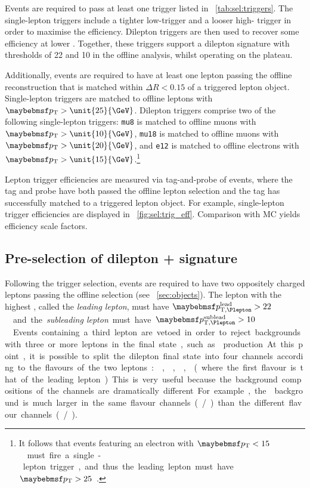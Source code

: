 Events are required to pass at least one trigger listed in \Table~\ref{tab:sel:triggers}. 
The single-lepton triggers include a tighter low-\pt trigger and a looser high-\pt 
trigger in order to maximise the efficiency. Dilepton triggers are then used to recover some 
efficiency at lower \pt. Together, these triggers support a dilepton signature with \pt 
thresholds of \unit{22}{\GeV} and \unit{10}{\GeV} in the offline analysis, whilst operating 
on the plateau.

Additionally, events are required to have at least one lepton passing the offline 
reconstruction that is matched within $\Delta R < 0.15$ of a triggered lepton object.
Single-lepton triggers are matched to offline leptons with $\pt > \unit{25}{\GeV}$. Dilepton 
triggers comprise two of the following single-lepton triggers: \texttt{mu8} is matched 
to offline muons with $\pt > \unit{10}{\GeV}$, \texttt{mu18} is matched to offline muons 
with $\pt > \unit{20}{\GeV}$, and \texttt{e12} is matched to offline electrons with 
$\pt > \unit{15}{\GeV}$.\footnote{
	It follows that events featuring an electron with \unit{$\pt < 15$}{\GeV} must fire a 
	single-lepton trigger, and thus the leading lepton must have \unit{$\pt > 25$}{\GeV}.
}

Lepton trigger efficiencies are measured via tag-and-probe of 
\HepProcess{\PZ \HepTo \Plepton\Plepton} events, where the tag and probe have both 
passed the offline lepton selection and the tag has successfully matched to a triggered 
lepton object. For example, single-lepton trigger efficiencies are displayed in 
\Figure~\ref{fig:sel:trig_eff}. Comparison with MC yields efficiency scale factors.



\subsection{Pre-selection of dilepton + \met signature}
\label{sec:selection:presel}

Following the trigger selection, events are required to have two oppositely charged 
leptons passing the offline selection (see \Section~\ref{sec:objects}). The lepton with 
the highest \pt, called the \textit{leading lepton}, must have 
\unit{$\ptleadlep > 22$}{\GeV} and the \textit{subleading lepton} must have 
\unit{$\ptsubleadlep > 10$}{\GeV}. Events containing a third lepton are vetoed in order to 
reject backgrounds with three or more leptons in the final state, such as \WZ production.

At this point, it is possible to split the dilepton final state into four channels 
according to the flavours of the two leptons: \eech, \mmch, \emch, \mech (where the first 
flavour is that of the leading lepton). This is very useful because the background 
compositions of the channels are dramatically different. For example, the \DYll background 
is much larger in the same flavour channels (\eech/\mmch) than the different flavour 
channels (\emch/\mech).

